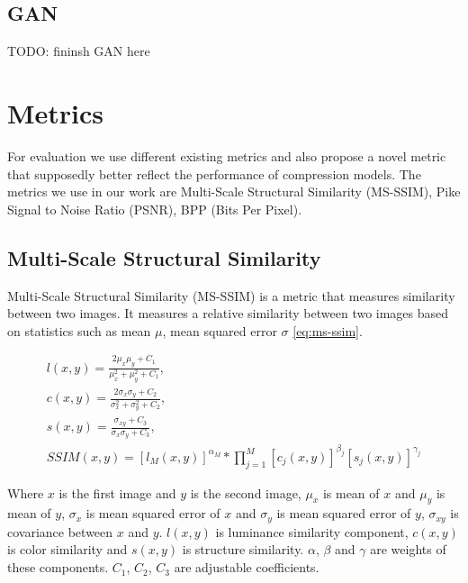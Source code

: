 \subsection{GAN}

TODO: fininsh GAN here

\section{Metrics}

For evaluation we use different existing metrics and also propose a novel metric that supposedly better reflect the performance of compression models. The metrics we use in our work are Multi-Scale Structural Similarity (MS-SSIM), Pike Signal to Noise Ratio (PSNR), BPP (Bits Per Pixel).

\subsection{Multi-Scale Structural Similarity}

Multi-Scale Structural Similarity (MS-SSIM) is a metric that measures similarity between two images. It measures a relative similarity between two images based on statistics such as mean $\mu$, mean squared error $\sigma$ \ref{eq:ms-ssim}.

\begin{equation}
    \label{eq:ms-ssim}
    \begin{split}
        l(x, y) = \frac{2\mu_x\mu_y + C_1}{\mu_x^2 + \mu_y^2 + C_1},\\
        c(x, y) = \frac{2\sigma_x\sigma_y + C_2}{\sigma_x^2 + \sigma_y^2 + C_2},\\
        s(x, y) = \frac{\sigma_{xy} + C_3}{\sigma_x\sigma_y + C_3},\\
        SSIM(x, y) = [l_M(x, y)]^{\alpha_M} * \prod_{j=1}^{M}[c_j(x, y)]^{\beta_j}[s_j(x, y)]^{\gamma_j}
    \end{split}
\end{equation}

Where $x$ is the first image and $y$ is the second image, $\mu_x$ is mean of $x$ and $\mu_y$ is mean of $y$, $\sigma_x$ is mean squared error of $x$ and $\sigma_y$ is mean squared error of $y$, $\sigma_{xy}$ is covariance between $x$ and $y$. $l(x, y)$ is luminance similarity component, $c(x, y)$ is color similarity and $s(x, y)$ is structure similarity. $\alpha$, $\beta$ and $\gamma$ are weights of these components. $C_1$, $C_2$, $C_3$ are adjustable coefficients.


